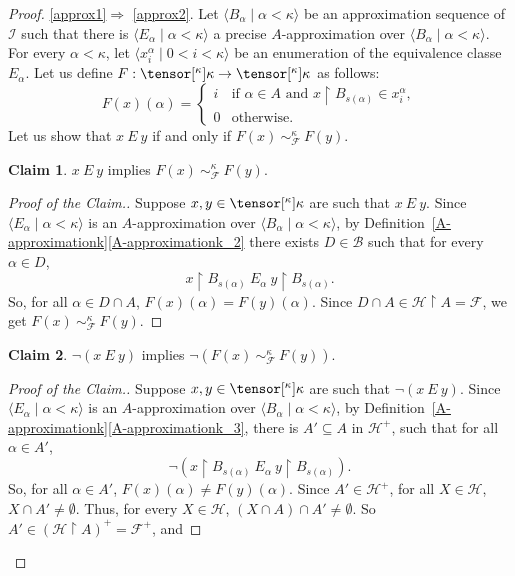 \documentclass{amsart}
\numberwithin{equation}{section}
\newcommand{\pre}[2]{\tensor[^{#1}]{#2}{}}
\newcommand{\seq}[2]{\langle #1 \mid #2 \rangle}
\newcommand{\1}{\mathbf{I}}
\newcommand{\2}{\mathbf{II}}
\renewcommand{\k}{\kappa}
\theoremstyle{definition}
\newtheorem{claim}{Claim}[theorem]
\theoremstyle{remark}
\begin{document}
\begin{proof}
\ref{approx1}$\Rightarrow$ \ref{approx2}.
Let $\seq{B_\alpha}{\alpha<\kappa}$ be an approximation sequence of $\mathcal{I}$ such that there is $\langle E_\alpha\mid \alpha<\kappa\rangle$ a precise $A$-approximation over $\seq{B_\alpha}{\alpha<\kappa}$. For every $\alpha<\kappa$, let $\langle x^\alpha_i\mid 0<i<\kappa\rangle$ be an enumeration of the equivalence classe $E_\alpha$. 
    Let us define $F:\pre{\k}{\kappa}\rightarrow\pre{\k}{\kappa}$ as follows:
        $$F(x)(\alpha)=\begin{cases} i &\mbox{if }\alpha\in A \mbox{ and } x\restriction B_{s(\alpha)}\in x_i^{\alpha},\\
    0 & \mbox{otherwise. }\end{cases}$$  
    Let us show that $x\ E\ y$ if and only if $F(x)\ \sim^\kappa_\mathcal{F}\ F(y)$.
    \begin{claim}
        $x\ E\ y$ implies $F(x)\ \sim^\kappa_\mathcal{F}\ F(y)$.
    \end{claim}
    \begin{proof}[Proof of the Claim.]
        Suppose $x,y\in \pre{\k}{\kappa}$ are such that $x\ E\ y$. Since $\langle E_\alpha\mid \alpha<\kappa\rangle$ is an $A$-approximation over $\seq{B_\alpha}{\alpha<\kappa}$, by Definition~\ref{A-approximationk}\ref{A-approximationk_2} there exists $D\in\mathcal{B}$ such that for every $\alpha\in D$, $$x\restriction B_{s(\alpha)}\ E_\alpha\ y\restriction B_{s(\alpha)}.$$ So, for all $\alpha\in D\cap A$, $F(x)(\alpha)=F(y)(\alpha)$. Since $D\cap A\in \mathcal{H}\restriction A=\mathcal{F}$, we get $F(x)\ \sim^\kappa_\mathcal{F}\ F(y)$.
    \end{proof}
    \begin{claim}
        $\neg(x\ E\ y)$ implies $\neg(F(x)\ \sim^\kappa_\mathcal{F}\ F(y))$.
    \end{claim}
    \begin{proof}[Proof of the Claim.]
        Suppose $x,y\in \pre{\k}{\kappa}$ are such that $\neg(x\ E\ y)$. Since $\langle E_\alpha\mid \alpha<\kappa\rangle$ is an $A$-approximation over $\seq{B_\alpha}{\alpha<\kappa}$, by Definition~\ref{A-approximationk}\ref{A-approximationk_3}, there is $A'\subseteq A$ in $\mathcal{H}^+$,  such that for all $\alpha\in A'$, $$\neg(x\restriction B_{s(\alpha)}\ E_\alpha\ y\restriction B_{s(\alpha)}).$$ So, for all $\alpha\in A'$, $F(x)(\alpha)\neq F(y)(\alpha)$. Since $A'\in\mathcal{H}^+$, for all $X\in \mathcal{H}$, $X\cap A'\neq\emptyset$. Thus, for every $X\in \mathcal{H}$, $(X\cap A)\cap A'\neq\emptyset$. So $A'\in (\mathcal{H}\restriction A)^+=\mathcal{F}^+$, and

\end{proof}
\end{proof}
\end{document}
